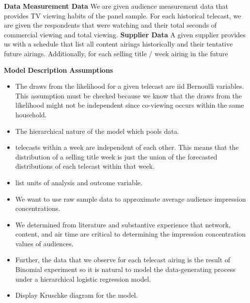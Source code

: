 \documentclass{article}
\begin{document}
\begin{outline}[enumerate]
        \2 \textbf{Data}
            \3 \textbf{Measurement Data}
                We are given audience measurement data that provides TV viewing habits
                of the panel sample. For each historical telecast, we are given the respondents
                that were watching and their total seconds of commercial viewing and total viewing.
            \3 \textbf{Supplier Data}
                A given supplier provides us with a schedule that list all content airings
                historically and their tentative future airings. Additionally, for each selling title / week
                airing in the future

   \1 \textbf{Model}
       \2 \textbf{Description}
           \3 \textbf{Assumptions}
               \begin{itemize}
                   \item The draws from the likelihood for a given telecast are iid Bernoulli variables. This assumption must be checked because
                       we know that the draws from the likelihood might not be independent since co-viewing occurs within the same household.
                   \item The hierarchical nature of the model which pools data.
                   \item telecasts within a week are independent of each other. This means that the distribution of a selling title week is just the union of the forecasted distributions of each telecast within that week.
               \end{itemize}

           \begin{itemize}
               \item list units of analysis and outcome variable.
               \item We want to use raw sample data to approximate average audience impression concentrations.
               \item We determined from literature and substantive experience that network, content, and air time
                 are critical to determining the impression concentration values of audiences.
               \item Further, the data that we observe for each telecast airing is the result of Binomial
                 experiment so it is natural to model the data-generating process under a hierarchical logistic regression model.
               \item Display Kruschke diagram for the model.
           \end{itemize}


\end{outline}
\end{document}
